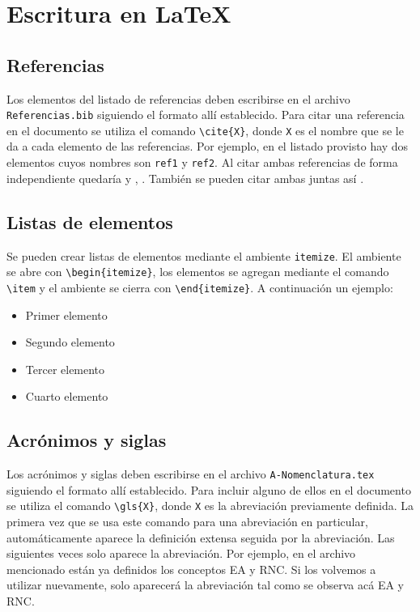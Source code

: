 \section{Escritura en LaTeX}

\subsection{Referencias}
Los elementos del listado de referencias deben escribirse en el archivo \verb!Referencias.bib! siguiendo el formato allí establecido. Para citar una referencia en el documento se utiliza el comando \verb!\cite{X}!, donde \verb!X! es el nombre que se le da a cada elemento de las referencias. Por ejemplo, en el listado provisto hay dos elementos cuyos nombres son \verb!ref1! y \verb!ref2!. Al citar ambas referencias de forma independiente quedaría \cite{ref1} y \cite{ref2}, \cite{ref3}. También se pueden citar ambas juntas así \cite{ref1, ref2}.

\subsection{Listas de elementos}
Se pueden crear listas de elementos mediante el ambiente \verb!itemize!. El ambiente se abre con \verb!\begin{itemize}!, los elementos se agregan mediante el comando \verb!\item! y el ambiente se cierra con \verb!\end{itemize}!. A continuación un ejemplo:

\begin{itemize}
    \item Primer elemento
    \item Segundo elemento
    \item Tercer elemento
    \item Cuarto elemento
\end{itemize}

\subsection{Acrónimos y siglas}
Los acrónimos y siglas deben escribirse en el archivo \verb!A-Nomenclatura.tex! siguiendo el formato allí establecido. Para incluir alguno de ellos en el documento se utiliza el comando \verb!\gls{X}!, donde \verb!X! es la abreviación previamente definida. La primera vez que se usa este comando para una abreviación en particular, automáticamente aparece la definición extensa seguida por la abreviación. Las siguientes veces solo aparece la abreviación. Por ejemplo, en el archivo mencionado están ya definidos los conceptos \gls{EA} y \gls{RNC}. Si los volvemos a utilizar nuevamente, solo aparecerá la abreviación tal como se observa acá \gls{EA} y \gls{RNC}.

